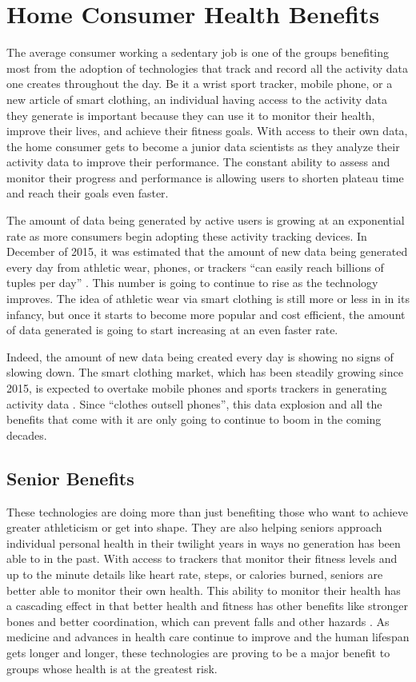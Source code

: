 \documentclass[sigconf]{acmart}
\begin{document}
\section{Home Consumer Health Benefits}

The average consumer working a sedentary job is one of the groups benefiting most from the adoption of technologies that track and record all the activity data one creates throughout the day. Be it a wrist sport tracker, mobile phone, or a new article of smart clothing, an individual having access to the activity data they generate is important because they can use it to monitor their health, improve their lives, and achieve their fitness goals. With access to their own data, the home consumer gets to become a junior data scientists as they analyze their activity data to improve their performance. The constant ability to assess and monitor their progress and performance is allowing users to shorten plateau time and reach their goals even faster.

The amount of data being generated by active users is growing at an exponential rate as more consumers begin adopting these activity tracking devices. In December of 2015, it was estimated that the amount of new data being generated every day from athletic wear, phones, or trackers ``can easily reach billions of tuples per day'' \cite{cortes2014}. This number is going to continue to rise as the technology improves. The idea of athletic wear via smart clothing is still more or less in in its infancy, but once it starts to become more popular and cost efficient, the amount of data generated is going to start increasing at an even faster rate.

Indeed, the amount of new data being created every day is showing no signs of slowing down. The smart clothing market, which has been steadily growing since 2015, is expected to overtake mobile phones and sports trackers in generating activity data \cite{hanuska2015}. Since ``clothes outsell phones''\cite{hanuska2015}, this data explosion and all the benefits that come with it are only going to continue to boom in the coming decades.

\subsection{Senior Benefits}

These technologies are doing more than just benefiting those who want to achieve greater athleticism or get into shape. They are also helping seniors approach individual personal health in their twilight years in ways no generation has been able to in the past. With access to trackers that monitor their fitness levels and up to the minute details like heart rate, steps, or calories burned, seniors are better able to monitor their own health. This ability to monitor their health has a cascading effect in that better health and fitness has other benefits like stronger bones and better coordination, which can prevent falls and other hazards \cite{valenzuela2016}. As medicine and advances in health care continue to improve and the human lifespan gets longer and longer, these technologies are proving to be a major benefit to groups whose health is at the greatest risk.
\end{document}
